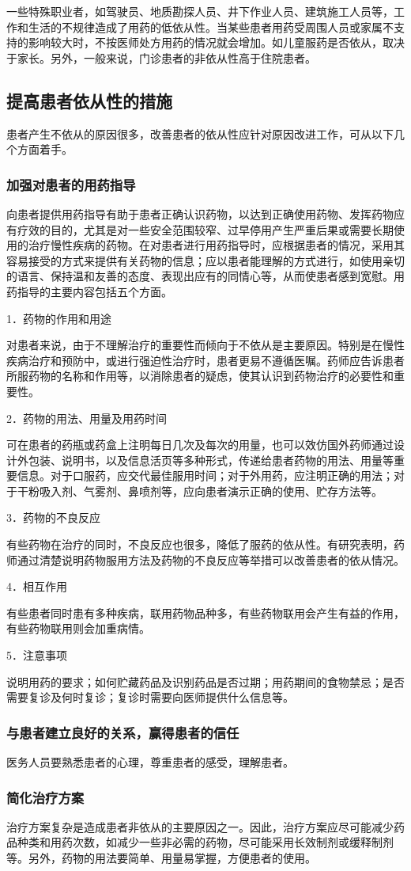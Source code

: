 一些特殊职业者，如驾驶员、地质勘探人员、井下作业人员、建筑施工人员等，工作和生活的不规律造成了用药的低依从性。当某些患者用药受周围人员或家属不支持的影响较大时，不按医师处方用药的情况就会增加。如儿童服药是否依从，取决于家长。另外，一般来说，门诊患者的非依从性高于住院患者。

\subsection{提高患者依从性的措施}

患者产生不依从的原因很多，改善患者的依从性应针对原因改进工作，可从以下几个方面着手。

\subsubsection{加强对患者的用药指导}

向患者提供用药指导有助于患者正确认识药物，以达到正确使用药物、发挥药物应有疗效的目的，尤其是对一些安全范围较窄、过早停用产生严重后果或需要长期使用的治疗慢性疾病的药物。在对患者进行用药指导时，应根据患者的情况，采用其容易接受的方式来提供有关药物的信息；应以患者能理解的方式进行，如使用亲切的语言、保持温和友善的态度、表现出应有的同情心等，从而使患者感到宽慰。用药指导的主要内容包括五个方面。

1．药物的作用和用途

对患者来说，由于不理解治疗的重要性而倾向于不依从是主要原因。特别是在慢性疾病治疗和预防中，或进行强迫性治疗时，患者更易不遵循医嘱。药师应告诉患者所服药物的名称和作用等，以消除患者的疑虑，使其认识到药物治疗的必要性和重要性。

2．药物的用法、用量及用药时间

可在患者的药瓶或药盒上注明每日几次及每次的用量，也可以效仿国外药师通过设计外包装、说明书，以及信息活页等多种形式，传递给患者药物的用法、用量等重要信息。对于口服药，应交代最佳服用时间；对于外用药，应注明正确的用法；对于干粉吸入剂、气雾剂、鼻喷剂等，应向患者演示正确的使用、贮存方法等。

3．药物的不良反应

有些药物在治疗的同时，不良反应也很多，降低了服药的依从性。有研究表明，药师通过清楚说明药物服用方法及药物的不良反应等举措可以改善患者的依从情况。

4．相互作用

有些患者同时患有多种疾病，联用药物品种多，有些药物联用会产生有益的作用，有些药物联用则会加重病情。

5．注意事项

说明用药的要求；如何贮藏药品及识别药品是否过期；用药期间的食物禁忌；是否需要复诊及何时复诊；复诊时需要向医师提供什么信息等。

\subsubsection{与患者建立良好的关系，赢得患者的信任}

医务人员要熟悉患者的心理，尊重患者的感受，理解患者。

\subsubsection{简化治疗方案}

治疗方案复杂是造成患者非依从的主要原因之一。因此，治疗方案应尽可能减少药品种类和用药次数，如减少一些非必需的药物，尽可能采用长效制剂或缓释制剂等。另外，药物的用法要简单、用量易掌握，方便患者的使用。